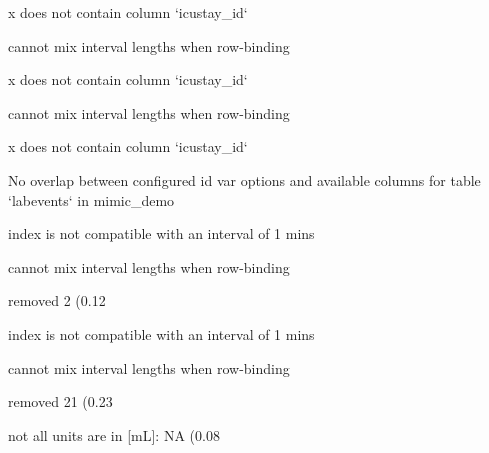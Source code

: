 \documentclass[
]{jss}
\begin{document}
\begin{CodeChunk}
\begin{CodeOutput}
x does not contain column `icustay_id`
\end{CodeOutput}

\begin{CodeOutput}
cannot mix interval lengths when row-binding
\end{CodeOutput}

\begin{CodeOutput}
x does not contain column `icustay_id`
\end{CodeOutput}

\begin{CodeOutput}
cannot mix interval lengths when row-binding
\end{CodeOutput}

\begin{CodeOutput}
x does not contain column `icustay_id`
\end{CodeOutput}

\begin{CodeOutput}
No overlap between configured id var options and available columns for table
`labevents` in mimic_demo
\end{CodeOutput}

\begin{CodeOutput}
index is not compatible with an interval of 1 mins
\end{CodeOutput}

\begin{CodeOutput}
cannot mix interval lengths when row-binding
\end{CodeOutput}

\begin{CodeOutput}
removed 2 (0.12%
\end{CodeOutput}

\begin{CodeOutput}
index is not compatible with an interval of 1 mins
\end{CodeOutput}

\begin{CodeOutput}
cannot mix interval lengths when row-binding
\end{CodeOutput}

\begin{CodeOutput}
removed 21 (0.23%
\end{CodeOutput}

\begin{CodeOutput}
not all units are in [mL]: NA (0.08%
\end{CodeOutput}


\end{CodeChunk}
\end{document}
